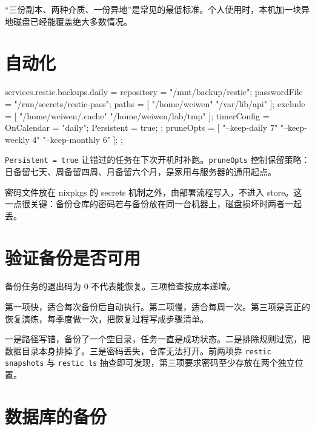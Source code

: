 “三份副本、两种介质、一份异地”是常见的最低标准。个人使用时，本机加一块异地磁盘已经能覆盖绝大多数情况。

\section{自动化}

\begin{nixcode}
services.restic.backups.daily = {
  repository = "/mnt/backup/restic";
  passwordFile = "/run/secrets/restic-pass";
  paths = [
    "/home/weiwen"
    "/var/lib/api"
  ];
  exclude = [
    "/home/weiwen/.cache"
    "/home/weiwen/lab/tmp"
  ];
  timerConfig = {
    OnCalendar = "daily";
    Persistent = true;
  };
  pruneOpts = [
    "--keep-daily 7"
    "--keep-weekly 4"
    "--keep-monthly 6"
  ];
};
\end{nixcode}

\texttt{Persistent = true} 让错过的任务在下次开机时补跑。\texttt{pruneOpts} 控制保留策略：日备留七天、周备留四周、月备留六个月，是家用与服务器的通用起点。

密码文件放在 nixpkgs 的 secrets 机制之外，由部署流程写入，不进入 store。这一点很关键：备份仓库的密码若与备份放在同一台机器上，磁盘损坏时两者一起丢。

\section{验证备份是否可用}

备份任务的退出码为 0 不代表能恢复。三项检查按成本递增。


第一项快，适合每次备份后自动执行。第二项慢，适合每周一次。第三项是真正的恢复演练，每季度做一次，把恢复过程写成步骤清单。

\begin{warnbox}[备份的三个常见失败]
一是路径写错，备份了一个空目录，任务一直是成功状态。二是排除规则过宽，把数据目录本身排掉了。三是密码丢失，仓库无法打开。前两项靠 \texttt{restic snapshots} 与 \texttt{restic ls} 抽查即可发现，第三项要求密码至少存放在两个独立位置。
\end{warnbox}

\section{数据库的备份}

